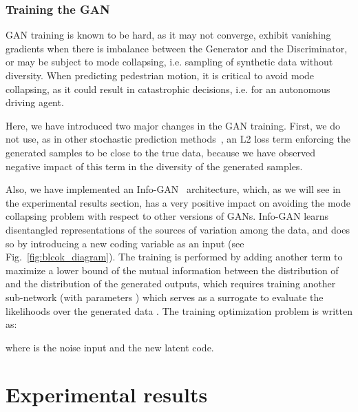 \documentclass[10pt,twocolumn,letterpaper]{article}
\begin{document}
\subsubsection{Training the GAN}

GAN training is known to be hard, as it may not converge, exhibit vanishing gradients when there is imbalance between the Generator and the Discriminator, or may be subject to mode collapsing, i.e. sampling of synthetic data without diversity. When predicting pedestrian motion, it is critical to avoid mode collapsing, as it could result in catastrophic decisions, i.e. for an autonomous driving agent.

Here, we have introduced two major changes in the GAN training. First, we do not use, as in other stochastic prediction methods~\cite{SocialGAN2018, SoPhie2018}, an L2 loss term  enforcing the generated samples to be close to the true data, because we have observed negative impact of this term in the diversity of the generated samples. 



Also, we have implemented an Info-GAN~\cite{Infogan2016} architecture, which, as we will see in the experimental results section, has a very positive impact on avoiding the mode collapsing problem with respect to other versions of GANs. Info-GAN learns disentangled representations of the sources of variation among the data, and does so by introducing a new coding variable  as an input (see Fig.~\ref{fig:blcok_diagram}). The training is performed by adding another term to maximize a lower bound of the mutual information between the distribution of  and the distribution of the generated outputs, which requires training another sub-network  (with parameters ) which serves as a surrogate to evaluate the likelihoods  over the generated data . The training optimization problem is written as:
	
{\small   
}
where  is the noise input and  the new latent code.












 
\section{Experimental results}


\def \xObsv {\mathbf{x}^i_{-\tau: 0}}
\def \xPred {\mathbf{x}^i_{1: T}}
\def \XObsv {\mathbf{X}^{-i}_{-\tau: 0}}
\def \XPred {\mathbf{X}^{-i}_{1: T}}
\end{document}
